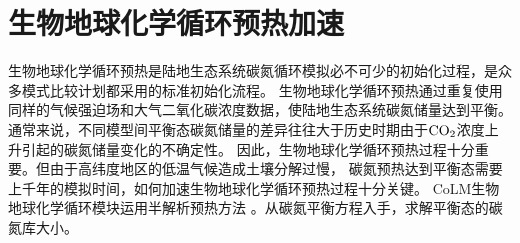 \chapter{生物地球化学循环预热加速}\label{生物地球化学循环预热加速}

生物地球化学循环预热是陆地生态系统碳氮循环模拟必不可少的初始化过程，是众多模式比较计划都采用的标准初始化流程。
生物地球化学循环预热通过重复使用同样的气候强迫场和大气二氧化碳浓度数据，使陆地生态系统碳氮储量达到平衡。
通常来说，不同模型间平衡态碳氮储量的差异往往大于历史时期由于$\rm CO_2$浓度上升引起的碳氮储量变化的不确定性。
因此，生物地球化学循环预热过程十分重要。但由于高纬度地区的低温气候造成土壤分解过慢，
碳氮预热达到平衡态需要上千年的模拟时间，如何加速生物地球化学循环预热过程十分关键。
CoLM生物地球化学循环模块运用半解析预热方法\citep{xia2012semi} 。从碳氮平衡方程入手，求解平衡态的碳氮库大小。

